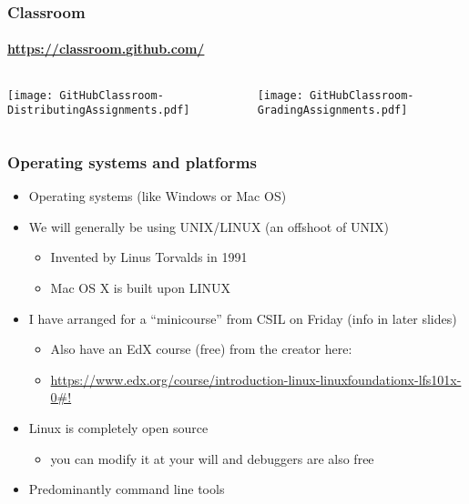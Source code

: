 \documentclass[hyperref={colorlinks=true}]{beamer}
\begin{document}
\begin{frame}%
  \frametitle{\github Classroom}
  \framesubtitle{\url{https://classroom.github.com/}}
  
    \begin{columns}
  
    
      \texttt{[image: GitHubClassroom-DistributingAssignments.pdf]}
    
    \pause
    
    
      \texttt{[image: GitHubClassroom-GradingAssignments.pdf]}
  
  \end{columns}
  
  
  \vspace{0.2cm}
  
  \centering {}
  
\end{frame}



\begin{frame}%
  \frametitle{Operating systems and platforms}
  
  \begin{itemize}
    \item Operating systems (like Windows or Mac OS)
    \item We will generally be using UNIX/LINUX (an offshoot of UNIX)
    \begin{itemize}
      \item Invented by Linus Torvalds in 1991
      \item Mac OS X is built upon LINUX
    \end{itemize}
    \item I have arranged for a ``minicourse'' from CSIL on Friday (info in later slides)
    \begin{itemize}
      \item Also have an EdX course (free) from the creator here:
      \item \url{https://www.edx.org/course/introduction-linux-linuxfoundationx-lfs101x-0\#!}
    \end{itemize}
    \item Linux is completely open source
    \begin{itemize}
      \item you can modify it at your will and debuggers are also free
    \end{itemize}
    \item Predominantly command line tools
  \end{itemize}
  
  
\end{frame}
\end{document}
